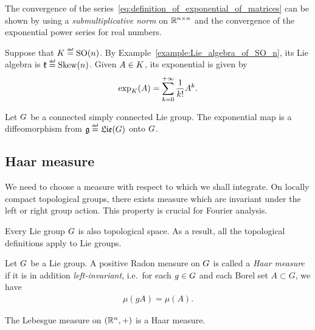 The convergence of the series~\eqref{eq:definition_of_exponential_of_matrices} can be shown
by using a \emph{submultiplicative norm} on ${\mathbb{R}}^{n \times n}$
and the convergence of the exponential power series for real numbers.

\begin{example}
    Suppose that $\CompactGroup \defeq \SpecialOrthogonalGroup n$.
    By Example~\ref{example:Lie_algebra_of_SO_n},
    its Lie algebra is $\LieAlgebraCompactGroup \defeq \SkewSymmetric n$.
    Given $A \in K$,
    its exponential is given by
    \begin{align*}
        \exp_K(A) = \sum_{k = 0}^{+\infty} \frac 1 {k!} A^k.
    \end{align*}
\end{example}

\begin{proposition}
    Let $G$ be a connected simply connected Lie group.
    The exponential map is a diffeomorphism from $\LieAlgebra \defeq \Lie(\Group)$ onto $G$.
\end{proposition}

\subsection{Haar measure}

We need to choose a measure with respect to which we shall integrate.
On locally compact topological groups,
there exists measure which are invariant under the left or right group action.
This property is crucial for Fourier analysis.

\begin{remark}
    Every Lie group $G$ is also topological space.
    As a result, all the topological definitions apply to Lie groups.
\end{remark}

\begin{definition}
    Let $G$ be a Lie group.
    A positive Radon measure on $G$ is called a \emph{Haar measure}
    if it is in addition \emph{left-invariant},
    i.e.\ for each $g \in G$ and each Borel set $A \subset G$, we have
    \begin{align*}
        \mu(g A) = \mu(A).
    \end{align*}
\end{definition}

\begin{example}
    The Lebesgue measure on $(\mathbb{R}^n, +)$ is a Haar measure.
\end{example}

